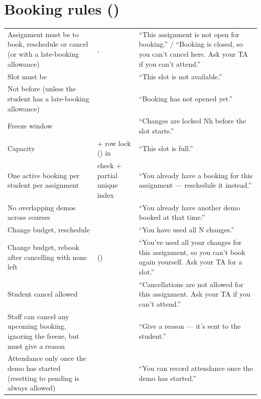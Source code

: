 \section[Booking rules]{Booking rules ()}

{\tablefont
\begin{xltabular}{\linewidth}{@{}P{30mm} P{30mm} L@{}}
  \toprule
   &  & \\
  \midrule
  \endhead
  Assignment must be  to book, reschedule or cancel (or  with a late-booking allowance) & ,  & ``This assignment is not open for booking.'' / ``Booking is closed, so you can't cancel here. Ask your TA if you can't attend.''\\
  Slot must be  &  & ``This slot is not available.''\\
  Not before  (unless the student has a late-booking allowance) &  & ``Booking has not opened yet.''\\
  Freeze window &  & ``Changes are locked Nh before the slot starts.''\\
  Capacity &  + row lock () in  & ``This slot is full.''\\
  One active booking per student per assignment &  check + partial unique index  & ``You already have a booking for this assignment --- reschedule it instead.''\\
  No overlapping demos across courses &  & ``You already have another demo booked at that time.''\\
  Change budget, reschedule &  & ``You have used all N changes.''\\
  Change budget, rebook after cancelling with none left &  () & ``You've used all your changes for this assignment, so you can't book again yourself. Ask your TA for a slot.''\\
  Student cancel allowed &  & ``Cancellations are not allowed for this assignment. Ask your TA if you can't attend.''\\
  Staff can cancel any upcoming booking, ignoring the freeze, but must give a reason &  & ``Give a reason --- it's sent to the student.''\\
  Attendance only once the demo has started (resetting to pending is always allowed) &  & ``You can record attendance once the demo has started.''\\
  \bottomrule
\end{xltabular}}

